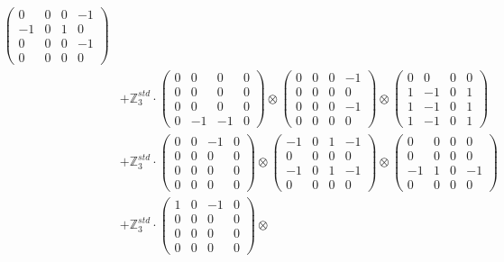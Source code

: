 \documentclass{article}
\begin{document}
{\begin{align}
            \begin{pmatrix} 0 & 0 & 0 & -1 \\ -1 & 0 & 1 & 0 \\ 0 & 0 & 0 & -1 \\ 0 & 0 & 0 & 0 \end{pmatrix} \\ 
        &+ \label{Rs13-Rc12-Solution-1-c18} \mathbb{Z}_3^{std} \cdot 
            \begin{pmatrix} 0 & 0 & 0 & 0 \\ 0 & 0 & 0 & 0 \\ 0 & 0 & 0 & 0 \\ 0 & -1 & -1 & 0 \end{pmatrix} \otimes 
            \begin{pmatrix} 0 & 0 & 0 & -1 \\ 0 & 0 & 0 & 0 \\ 0 & 0 & 0 & -1 \\ 0 & 0 & 0 & 0 \end{pmatrix} \otimes 
            \begin{pmatrix} 0 & 0 & 0 & 0 \\ 1 & -1 & 0 & 1 \\ 1 & -1 & 0 & 1 \\ 1 & -1 & 0 & 1 \end{pmatrix} \\ 
        &+ \label{Rs13-Rc12-Solution-1-c19} \mathbb{Z}_3^{std} \cdot 
            \begin{pmatrix} 0 & 0 & -1 & 0 \\ 0 & 0 & 0 & 0 \\ 0 & 0 & 0 & 0 \\ 0 & 0 & 0 & 0 \end{pmatrix} \otimes 
            \begin{pmatrix} -1 & 0 & 1 & -1 \\ 0 & 0 & 0 & 0 \\ -1 & 0 & 1 & -1 \\ 0 & 0 & 0 & 0 \end{pmatrix} \otimes 
            \begin{pmatrix} 0 & 0 & 0 & 0 \\ 0 & 0 & 0 & 0 \\ -1 & 1 & 0 & -1 \\ 0 & 0 & 0 & 0 \end{pmatrix} \\ 
        &+ \label{Rs13-Rc12-Solution-1-c20} \mathbb{Z}_3^{std} \cdot 
            \begin{pmatrix} 1 & 0 & -1 & 0 \\ 0 & 0 & 0 & 0 \\ 0 & 0 & 0 & 0 \\ 0 & 0 & 0 & 0 \end{pmatrix} \otimes 

\end{align}}
\end{document}
